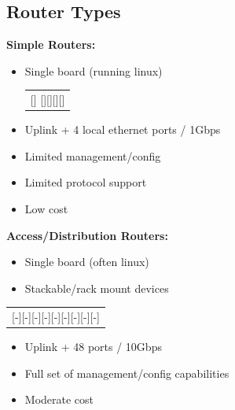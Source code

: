 \documentclass[11pt]{article}
\begin{document}
\subsection{Router Types}
\label{sec:orgheadline63}
\textbf{Simple Routers:}
\begin{itemize}
\item Single board (running linux)
\begin{center}
\begin{tabular}{l}
[]  [][][][]\\
\end{tabular}
\end{center}
\item Uplink + 4 local ethernet ports / 1Gbps
\item Limited management/config
\item Limited protocol support
\item Low cost
\end{itemize}

\textbf{Access/Distribution Routers:}
\begin{itemize}
\item Single board (often linux)
\item Stackable/rack mount devices
\end{itemize}
\begin{center}
\begin{tabular}{l}
[-][-][-][-][-][-][-][-][-]\\
\end{tabular}
\end{center}
\begin{itemize}
\item Uplink + 48 ports / 10Gbps
\item Full set of management/config capabilities
\item Moderate cost
\end{itemize}
\end{document}
